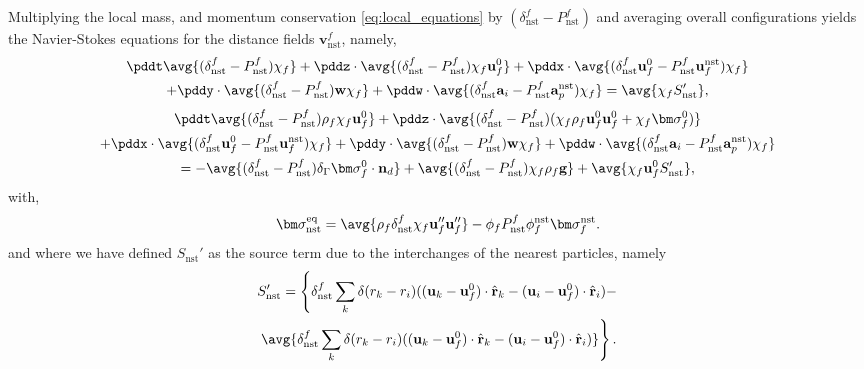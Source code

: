 Multiplying the local mass, and momentum conservation \eqref{eq:local_equations} by $(\delta_\text{nst}^f - P_\text{nst}^f)$ and averaging overall configurations yields the Navier-Stokes equations for the distance fields $\textbf{v}_\text{nst}^f$, namely,
\begin{multline}
    \pddt \avg{(\delta_\text{nst}^f - P_\text{nst}^f)\chi_f}
    +  \pddz \cdot \avg{(\delta_\text{nst}^f - P_\text{nst}^f) \chi_f\textbf{u}^0_f}
    +  \pddx \cdot \avg{(\delta_\text{nst}^f \textbf{u}_f^0 - P_\text{nst}^f\textbf{u}_f^\text{nst}) \chi_f}\\
    +  \pddy \cdot \avg{(\delta_\text{nst}^f - P_\text{nst}^f) \textbf{w} \chi_f}
    +  \pddw \cdot \avg{(\delta_\text{nst}^f \textbf{a}_i - P_\text{nst}^f \textbf{a}_p^\text{nst}) \chi_f}
    = \avg{
        \chi_f
        S_\text{nst}'
    },
    \label{eq:mass_nst_d}
\end{multline}
\begin{multline}
    \pddt \avg{(\delta_\text{nst}^f - P_\text{nst}^f)\rho_f\chi_f\textbf{u}_f^0}
    + \pddz\cdot \avg{ (\delta_\text{nst}^f - P_\text{nst}^f) (\chi_f \rho_f \textbf{u}_f^0 \textbf{u}^0_f + \chi_f \bm\sigma_f^0)}\\
    +  \pddx \cdot \avg{(\delta_\text{nst}^f \textbf{u}_f^0 - P_\text{nst}^f\textbf{u}_f^\text{nst}) \chi_f}
    +  \pddy \cdot \avg{(\delta_\text{nst}^f - P_\text{nst}^f) \textbf{w} \chi_f}
    +  \pddw \cdot \avg{(\delta_\text{nst}^f \textbf{a}_i - P_\text{nst}^f \textbf{a}_p^\text{nst}) \chi_f}\\
    = 
    - \avg{(\delta_\text{nst}^f - P_\text{nst}^f)\delta_\Gamma \bm\sigma_f^0 \cdot \textbf{n}_d }
    + \avg{(\delta_\text{nst}^f - P_\text{nst}^f)\chi_f\rho_f\textbf{g}} 
    + 
    \avg{\chi_f \textbf{u}_f^0 S'_\text{nst} },
    \label{eq:momentum_nst_d}
\end{multline}
with, 
\begin{equation}
    \bm\sigma_\text{nst}^\text{eq}=
    \avg{\rho_f\delta_\text{nst}^f \chi_f \textbf{u}''_f\textbf{u}''_f} 
    - \phi_f P_\text{nst}^f \phi^\text{nst}_f\bm\sigma^\text{nst}_f. 
\end{equation}
and where we have defined $S_\text{nst}'$ as the source term due to the interchanges of the nearest particles, namely
\begin{multline}
    S_\text{nst}'
    =
    \left\{
    \delta_\text{nst}^f
        \sum_k 
        \delta(r_k - r_i)
        ((\textbf{u}_k - \textbf{u}_f^0) \cdot \hat{\textbf{r}}_k - (\textbf{u}_i  - \textbf{u}_f^0)\cdot \hat{\textbf{r}}_i) 
    - \right.\\ \left.
    \avg{
         \delta_\text{nst}^f
        \sum_k 
        \delta(r_k - r_i)
        ((\textbf{u}_k - \textbf{u}_f^0) \cdot \hat{\textbf{r}}_k - (\textbf{u}_i  - \textbf{u}_f^0)\cdot \hat{\textbf{r}}_i) 
    }
    \right\}. 
\end{multline}
